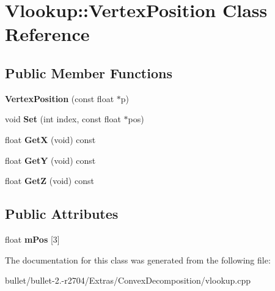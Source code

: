 \hypertarget{class_vlookup_1_1_vertex_position}{\section{Vlookup\+:\+:Vertex\+Position Class Reference}
\label{class_vlookup_1_1_vertex_position}
}
\subsection*{Public Member Functions}
\begin{DoxyCompactItemize}
\item 
\hypertarget{class_vlookup_1_1_vertex_position_a7ae0c9b4041edad1fbbdffdc2c41c04c}{{\bfseries Vertex\+Position} (const float $\ast$p)}\label{class_vlookup_1_1_vertex_position_a7ae0c9b4041edad1fbbdffdc2c41c04c}

\item 
\hypertarget{class_vlookup_1_1_vertex_position_a254f63171acc78499f0cf24588bafce7}{void {\bfseries Set} (int index, const float $\ast$pos)}\label{class_vlookup_1_1_vertex_position_a254f63171acc78499f0cf24588bafce7}

\item 
\hypertarget{class_vlookup_1_1_vertex_position_a784105feaa8f05a73ea8ba574f5d566a}{float {\bfseries Get\+X} (void) const }\label{class_vlookup_1_1_vertex_position_a784105feaa8f05a73ea8ba574f5d566a}

\item 
\hypertarget{class_vlookup_1_1_vertex_position_af5dd77347f162b8db27b767f097a17f2}{float {\bfseries Get\+Y} (void) const }\label{class_vlookup_1_1_vertex_position_af5dd77347f162b8db27b767f097a17f2}

\item 
\hypertarget{class_vlookup_1_1_vertex_position_ae30ba2ef2b91703c510c724ac6192907}{float {\bfseries Get\+Z} (void) const }\label{class_vlookup_1_1_vertex_position_ae30ba2ef2b91703c510c724ac6192907}

\end{DoxyCompactItemize}
\subsection*{Public Attributes}
\begin{DoxyCompactItemize}
\item 
\hypertarget{class_vlookup_1_1_vertex_position_ac03d6d5bcdda83f55e5ba7c777393f73}{float {\bfseries m\+Pos} \mbox{[}3\mbox{]}}\label{class_vlookup_1_1_vertex_position_ac03d6d5bcdda83f55e5ba7c777393f73}

\end{DoxyCompactItemize}


The documentation for this class was generated from the following file\+:\begin{DoxyCompactItemize}
\item 
bullet/bullet-\/2.-\/r2704/\+Extras/\+Convex\+Decomposition/vlookup.\+cpp\end{DoxyCompactItemize}
